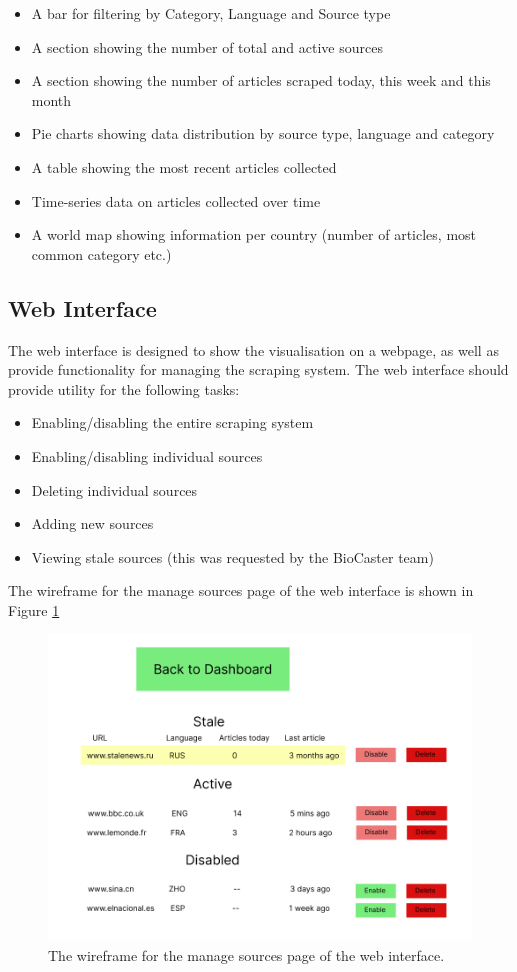 \documentclass{l4proj}
\begin{document}
\begin{itemize}
    \item A bar for filtering by Category, Language and Source type
    \item A section showing the number of total and active sources
    \item A section showing the number of articles scraped today, this week and this month
    \item Pie charts showing data distribution by source type, language and category
    \item A table showing the most recent articles collected
    \item Time-series data on articles collected over time
    \item A world map showing information per country (number of articles, most common category etc.)
\end{itemize}

\subsection{Web Interface}
The web interface is designed to show the visualisation on a webpage, as well as provide functionality for managing the scraping system. The web interface should provide utility for the following tasks:
\begin{itemize}
    \item Enabling/disabling the entire scraping system
    \item Enabling/disabling individual sources
    \item Deleting individual sources
    \item Adding new sources
    \item Viewing stale sources (this was requested by the BioCaster team)
\end{itemize}
The wireframe for the manage sources page of the web interface is shown in Figure \ref{fig:interface-wireframe} 
 \begin{figure}[h]
\centering
\includegraphics[width=\textwidth]{images/interface-wireframe-sources.png}
\caption{The wireframe for the manage sources page of the web interface.}
\label{fig:interface-wireframe}
\end{figure}
\end{document}
